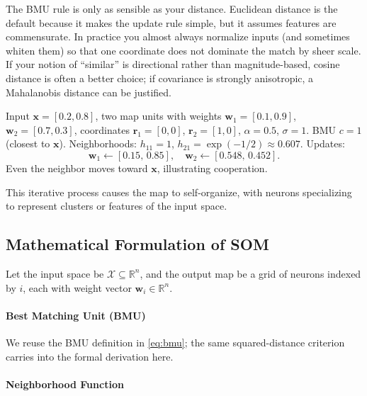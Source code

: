 \begin{tcolorbox}[summarybox, title={Author's note: distance is part of the model}]
The BMU rule is only as sensible as your distance. Euclidean distance is the default because it makes the update rule simple, but it assumes features are commensurate. In practice you almost always normalize inputs (and sometimes whiten them) so that one coordinate does not dominate the match by sheer scale. If your notion of ``similar'' is directional rather than magnitude-based, cosine distance is often a better choice; if covariance is strongly anisotropic, a Mahalanobis distance can be justified.
\end{tcolorbox}

\begin{tcolorbox}[summarybox, title={Tiny numeric step (online update)}]
Input \(\mathbf{x}=[0.2,0.8]\), two map units with weights \(\mathbf{w}_1=[0.1,0.9]\), \(\mathbf{w}_2=[0.7,0.3]\), coordinates \(\mathbf{r}_1=[0,0]\), \(\mathbf{r}_2=[1,0]\), \(\alpha=0.5\), \(\sigma=1\). BMU \(c=1\) (closest to \(\mathbf{x}\)). Neighborhoods: \(h_{11}=1\), \(h_{21}=\exp(-1/2)\approx 0.607\). Updates:
\[
\mathbf{w}_1\leftarrow [0.15,\,0.85],\quad
\mathbf{w}_2\leftarrow [0.548,\,0.452].
\]
Even the neighbor moves toward \(\mathbf{x}\), illustrating cooperation.
\end{tcolorbox}

This iterative process causes the map to self-organize, with neurons specializing to represent clusters or features of the input space.

\subsection{Mathematical Formulation of SOM}
\label{sec:som_mathematical_formulation_of_som}

Let the input space be \(\mathcal{X} \subseteq \mathbb{R}^n\), and the output map be a grid of neurons indexed by \(i\), each with weight vector \(\mathbf{w}_i \in \mathbb{R}^n\).

\paragraph{Best Matching Unit (BMU)}

We reuse the BMU definition in \eqref{eq:bmu}; the same squared-distance criterion carries into the formal derivation here.

\paragraph{Neighborhood Function}


